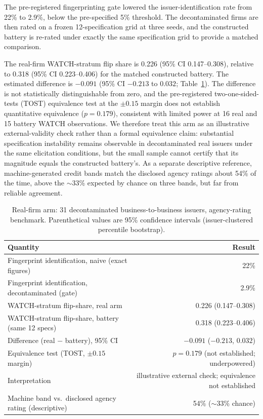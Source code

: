 \documentclass[a4paper,fleqn]{cas-sc}
\begin{document}
The pre-registered fingerprinting gate lowered the issuer-identification rate from 22\% to 2.9\%, below
the pre-specified 5\% threshold. The decontaminated firms are then rated on a frozen 12-specification grid
at three seeds, and the constructed battery is re-rated under exactly the same specification grid to
provide a matched comparison.

The real-firm WATCH-stratum flip share is 0.226 (95\% CI 0.147--0.308), relative to 0.318 (95\% CI
0.223--0.406) for the matched constructed battery. The estimated difference is $-0.091$ (95\% CI $-0.213$
to $0.032$; Table~\ref{tab:realarm}). The difference is not statistically distinguishable from zero, and
the pre-registered two-one-sided-tests (TOST) equivalence test at the $\pm0.15$ margin does not establish
quantitative equivalence ($p=0.179$), consistent with limited power at 16 real and 15 battery WATCH
observations. We therefore treat this arm as an illustrative external-validity check rather than a
formal equivalence claim: substantial specification instability remains observable in decontaminated real
issuers under the same elicitation conditions, but the small sample cannot certify that its magnitude
equals the constructed battery's. As a separate descriptive reference, machine-generated credit bands
match the disclosed agency ratings about 54\% of the time, above the $\sim$33\% expected by chance on
three bands, but far from reliable agreement.

\begin{table}[t]\centering
\caption{Real-firm arm: 31 decontaminated business-to-business issuers, agency-rating benchmark.
Parenthetical values are 95\% confidence intervals (issuer-clustered percentile bootstrap).}
\label{tab:realarm}
\begin{tabular}{lr}\toprule
Quantity & Result \\\midrule
Fingerprint identification, naive (exact figures) & 22\% \\
Fingerprint identification, decontaminated (gate) & 2.9\% \\
WATCH-stratum flip-share, real arm & 0.226 (0.147--0.308) \\
WATCH-stratum flip-share, battery (same 12 specs) & 0.318 (0.223--0.406) \\
Difference (real $-$ battery), 95\% CI & $-0.091$ ($-0.213$, $0.032$) \\
Equivalence test (TOST, $\pm0.15$ margin) & $p=0.179$ (not established; underpowered) \\
Interpretation & illustrative external check; equivalence not established \\
Machine band vs.\ disclosed agency rating (descriptive) & 54\% ($\sim$33\% chance) \\\bottomrule
\end{tabular}\end{table}
\end{document}
